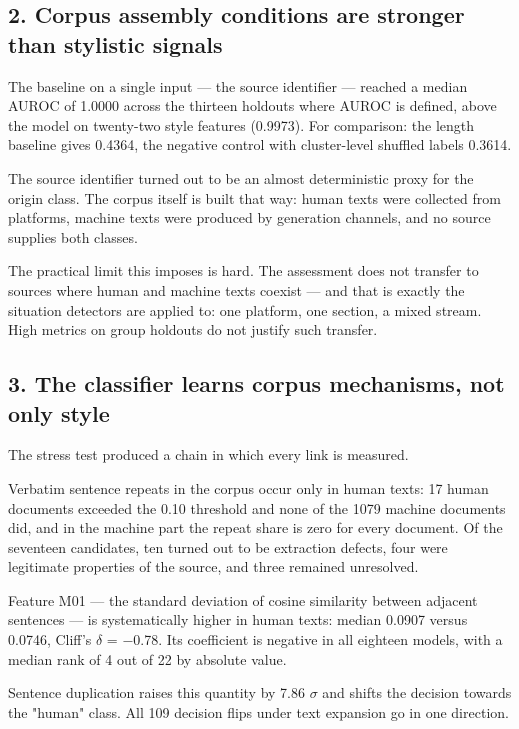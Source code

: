 \documentclass[11pt,a4paper]{article}
\renewcommand{\_}{\textunderscore\allowbreak}
\begin{document}
\subsection{2. Corpus assembly conditions are stronger than stylistic signals}

The baseline on a single input — the source identifier — reached a median AUROC
of 1.0000 across the thirteen holdouts where AUROC is defined, above the model on twenty-two style features
(0.9973). For comparison: the length baseline gives 0.4364, the negative control
with cluster-level shuffled labels 0.3614.

The source identifier turned out to be an almost deterministic proxy for the
origin class. The corpus itself is built that way: human texts were collected
from platforms, machine texts were produced by generation channels, and no source
supplies both classes.

The practical limit this imposes is hard. The assessment does not transfer to
sources where human and machine texts coexist — and that is exactly the situation
detectors are applied to: one platform, one section, a mixed stream. High metrics
on group holdouts do not justify such transfer.

\subsection{3. The classifier learns corpus mechanisms, not only style}

The stress test produced a chain in which every link is measured.

Verbatim sentence repeats in the corpus occur only in human texts: 17 human
documents exceeded the 0.10 threshold and none of the 1079 machine documents did,
and in the machine part the repeat share is zero for every document. Of the
seventeen candidates, ten turned out to be extraction defects, four were
legitimate properties of the source, and three remained unresolved.

Feature M01 — the standard deviation of cosine similarity between adjacent
sentences — is systematically higher in human texts: median 0.0907 versus 0.0746,
Cliff's $\delta$ = $-$0.78. Its coefficient is negative in all eighteen models, with a
median rank of 4 out of 22 by absolute value.

Sentence duplication raises this quantity by 7.86 $\sigma$ and shifts the decision
towards the "human" class. All 109 decision flips under text expansion go in one
direction.
\end{document}
